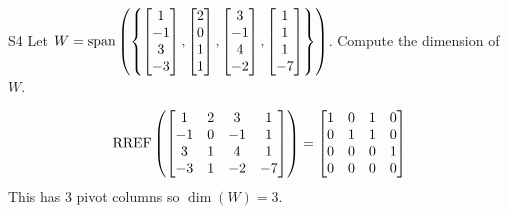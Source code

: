 \begin{problem}{S4}
Let \(W=\operatorname{span}\left( \left\{ \begin{bmatrix} 1 \\ -1 \\ 3 \\ -3 \end{bmatrix},\begin{bmatrix} 2 \\ 0 \\ 1 \\ 1 \end{bmatrix}, \begin{bmatrix} 3 \\ -1 \\ 4 \\ -2 \end{bmatrix},  \begin{bmatrix} 1 \\ 1 \\ 1 \\ -7 \end{bmatrix} \right\}\right)\).  Compute the dimension of \(W\).
\end{problem}
\begin{solution}
\[\operatorname{RREF} \left( \begin{bmatrix} 1 & 2 & 3 & 1 \\ -1 & 0 & -1 & 1 \\ 3 & 1 & 4 & 1 \\ -3 & 1 & -2 & -7 \end{bmatrix} \right) =  \begin{bmatrix} 1 & 0 & 1 & 0 \\ 0 & 1 & 1 & 0 \\ 0 & 0 & 0 & 1 \\ 0 & 0 & 0 & 0\end{bmatrix}\]
This has 3 pivot columns so \(\dim(W)=3\).
\end{solution}







